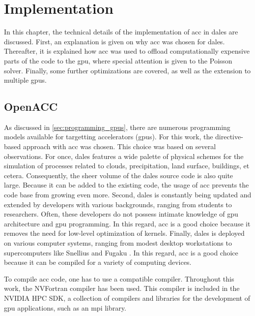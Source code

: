 \chapter{Implementation} \label{chap:implementation}
In this chapter, the technical details of the implementation of \acrshort{acc} in \acrshort{dales} are discussed. First, an explanation is given on why \acrshort{acc} was chosen for \acrshort{dales}. Thereafter, it is explained how \acrshort{acc} was used to offload computationally expensive parts of the code to the \acrshort{gpu}, where special attention is given to the Poisson solver. Finally, some further optimizations are covered, as well as the extension to multiple \acrshort{gpu}s.

\section{OpenACC}
As discussed in \autoref{sec:programming_gpus}, there are numerous programming models available for targetting accelerators (\acrshort{gpu}s). For this work, the directive-based approach with \acrshort{acc} was chosen. This choice was based on several observations. For once, \acrshort{dales} features a wide palette of physical schemes for the simulation of processes related to clouds, precipitation, land surface, buildings, et cetera. Consequently, the sheer volume of the \acrshort{dales} source code is also quite large. Because it can be added to the existing code, the usage of \acrshort{acc} prevents the code base from growing even more. Second, \acrshort{dales} is constantly being updated and extended by developers with various backgrounds, ranging from students to researchers. Often, these developers do not possess intimate knowledge of \acrshort{gpu} architecture and \acrshort{gpu} programming. In this regard, \acrshort{acc} is a good choice because it removes the need for low-level optimization of kernels. Finally, \acrshort{dales} is deployed on various computer systems, ranging from modest desktop workstations to supercomputers like Snellius and Fugaku \citep{janssonCloudBotanyShallow2023}. In this regard, \acrshort{acc} is a good choice because it can be compiled for a variety of computing devices.

To compile \acrshort{acc} code, one has to use a compatible compiler. Throughout this work, the NVFortran compiler has been used. This compiler is included in the NVIDIA HPC SDK, a collection of compilers and libraries for the development of \acrshort{gpu} applications, such as an \acrshort{mpi} library. 

